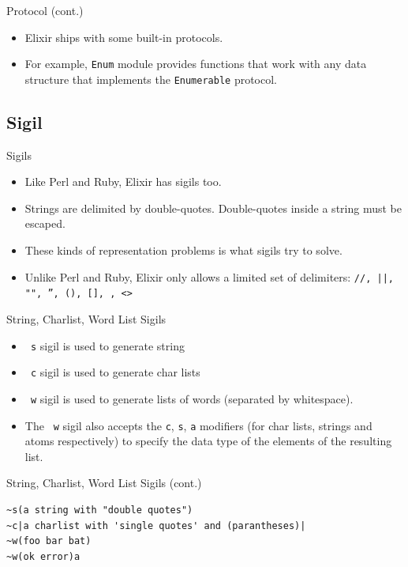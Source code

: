 \documentclass[12pt]{beamer}
\begin{document}
\begin{frame}{Protocol (cont.)}
  \begin{itemize}
    \item Elixir ships with some built-in protocols.
    \item For example, \texttt{Enum} module provides functions that work with any data structure that implements the \texttt{Enumerable} protocol.
  \end{itemize}
\end{frame}

\subsection{Sigil}
\begin{frame}{Sigils}
  \begin{itemize}
    \item Like Perl and Ruby, Elixir has sigils too.
    \item Strings are delimited by double-quotes. Double-quotes inside a string must be escaped.
    \item These kinds of representation problems is what sigils try to solve.
    \item Unlike Perl and Ruby, Elixir only allows a limited set of delimiters: \texttt{//, ||, "", '', (), [], {}, <>}
  \end{itemize}
\end{frame}

\begin{frame}[fragile]{String, Charlist, Word List Sigils}
  \begin{itemize}
    \item \texttt{~s} sigil is used to generate string
    \item \texttt{~c} sigil is used to generate char lists
    \item \texttt{~w} sigil is used to generate lists of words (separated by whitespace).
    \item The \texttt{~w} sigil also accepts the \texttt{c}, \texttt{s}, \texttt{a} modifiers (for char lists, strings and atoms respectively) to specify the data type of the elements of the resulting list.
  \end{itemize}
\end{frame}

\begin{frame}[fragile]{String, Charlist, Word List Sigils (cont.)}
  \begin{verbatim}
~s(a string with "double quotes")
~c|a charlist with 'single quotes' and (parantheses)|
~w(foo bar bat)
~w(ok error)a
  \end{verbatim}
\end{frame}
\end{document}
